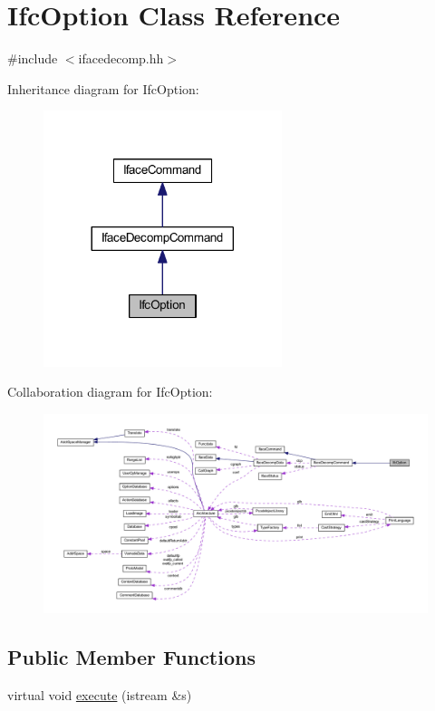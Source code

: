 \hypertarget{class_ifc_option}{}\section{Ifc\+Option Class Reference}
\label{class_ifc_option}


{\ttfamily \#include $<$ifacedecomp.\+hh$>$}



Inheritance diagram for Ifc\+Option\+:
\nopagebreak
\begin{figure}[H]
\begin{center}
\leavevmode
\includegraphics[width=197pt]{class_ifc_option__inherit__graph}
\end{center}
\end{figure}


Collaboration diagram for Ifc\+Option\+:
\nopagebreak
\begin{figure}[H]
\begin{center}
\leavevmode
\includegraphics[width=350pt]{class_ifc_option__coll__graph}
\end{center}
\end{figure}
\subsection*{Public Member Functions}
\begin{DoxyCompactItemize}
\item 
virtual void \mbox{\hyperlink{class_ifc_option_a2337595063d7701739837999034ac8bf}{execute}} (istream \&s)
\end{DoxyCompactItemize}
